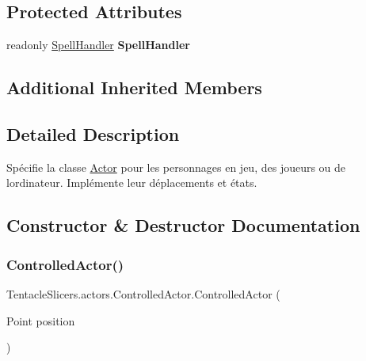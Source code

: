 \subsection*{Protected Attributes}
\begin{DoxyCompactItemize}
\item 
\mbox{\label{class_tentacle_slicers_1_1actors_1_1_controlled_actor_a09d03925d78f5ab41cc0166af1024dd6}} 
readonly \hyperlink{class_tentacle_slicers_1_1spells_1_1_spell_handler}{Spell\+Handler} {\bfseries Spell\+Handler}
\end{DoxyCompactItemize}
\subsection*{Additional Inherited Members}


\subsection{Detailed Description}
Spécifie la classe \hyperlink{class_tentacle_slicers_1_1actors_1_1_actor}{Actor} pour les personnages en jeu, des joueurs ou de l\textquotesingle{}ordinateur. Implémente leur déplacements et états. 



\subsection{Constructor \& Destructor Documentation}
\mbox{\label{class_tentacle_slicers_1_1actors_1_1_controlled_actor_ae314ebe27f3a906ca6aff7b0f290d278}} 
\subsubsection{\texorpdfstring{Controlled\+Actor()}{ControlledActor()}}
{\footnotesize\ttfamily Tentacle\+Slicers.\+actors.\+Controlled\+Actor.\+Controlled\+Actor (\begin{DoxyParamCaption}\item[{Point}]{position }\end{DoxyParamCaption})\hspace{0.3cm}{\ttfamily [protected]}}



